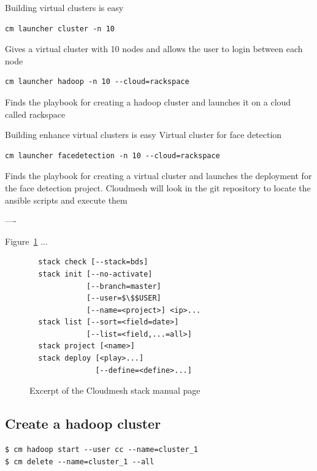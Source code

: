 Building virtual clusters is easy

\begin{Verbatim}
cm launcher cluster -n 10
\end{Verbatim}

Gives a virtual cluster with 10 nodes and allows the user to login between each node

\begin{Verbatim}
cm launcher hadoop -n 10 --cloud=rackspace
\end{Verbatim}

Finds the playbook for creating a hadoop cluster and launches it on a cloud called rackspace

Building enhance virtual clusters is easy
Virtual cluster for face detection

\begin{Verbatim}
cm launcher facedetection -n 10 --cloud=rackspace
\end{Verbatim}

Finds the playbook for creating a virtual cluster and launches the
deployment for the face detection project.  Cloudmesh will look in the
git repository to locate the ansible scripts and execute them



----



Figure~\ref{F:cm-stack-command} ...

\begin{figure}[htb]
\begin{Verbatim}
  stack check [--stack=bds]
  stack init [--no-activate] 
             [--branch=master] 
             [--user=$\$$USER] 
             [--name=<project>] <ip>...
  stack list [--sort=<field=date>] 
             [--list=<field,...=all>]
  stack project [<name>]
  stack deploy [<play>...] 
               [--define=<define>...]
\end{Verbatim}
\caption{Excerpt of the Cloudmesh stack manual page}
\label{F:cm-stack-command}
\end{figure}


\subsection{Create a hadoop cluster}

\begin{Verbatim}[fontfamily=helvetica]
$ cm hadoop start --user cc --name=cluster_1
$ cm delete --name=cluster_1 --all  
\end{Verbatim}


